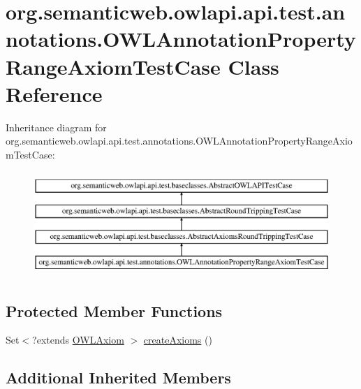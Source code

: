 \hypertarget{classorg_1_1semanticweb_1_1owlapi_1_1api_1_1test_1_1annotations_1_1_o_w_l_annotation_property_range_axiom_test_case}{\section{org.\-semanticweb.\-owlapi.\-api.\-test.\-annotations.\-O\-W\-L\-Annotation\-Property\-Range\-Axiom\-Test\-Case Class Reference}
\label{classorg_1_1semanticweb_1_1owlapi_1_1api_1_1test_1_1annotations_1_1_o_w_l_annotation_property_range_axiom_test_case}
}
Inheritance diagram for org.\-semanticweb.\-owlapi.\-api.\-test.\-annotations.\-O\-W\-L\-Annotation\-Property\-Range\-Axiom\-Test\-Case\-:\begin{figure}[H]
\begin{center}
\leavevmode
\includegraphics[height=4.000000cm]{classorg_1_1semanticweb_1_1owlapi_1_1api_1_1test_1_1annotations_1_1_o_w_l_annotation_property_range_axiom_test_case}
\end{center}
\end{figure}
\subsection*{Protected Member Functions}
\begin{DoxyCompactItemize}
\item 
Set$<$?extends \hyperlink{interfaceorg_1_1semanticweb_1_1owlapi_1_1model_1_1_o_w_l_axiom}{O\-W\-L\-Axiom} $>$ \hyperlink{classorg_1_1semanticweb_1_1owlapi_1_1api_1_1test_1_1annotations_1_1_o_w_l_annotation_property_range_axiom_test_case_aac5800dfc2fd98015d5cc73020ce4ba2}{create\-Axioms} ()
\end{DoxyCompactItemize}
\subsection*{Additional Inherited Members}


